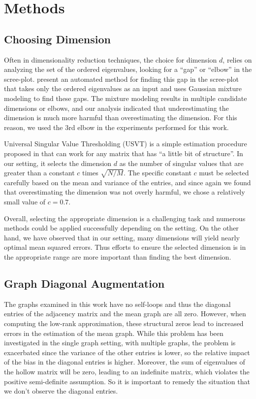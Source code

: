 \documentclass[10pt,letterpaper]{article}
\begin{document}
\section{Methods}
\label{sec:method}

\subsection{Choosing Dimension}
\label{section:dim_select}
Often in dimensionality reduction techniques, the choice for dimension $d$, relies on analyzing the set of the ordered eigenvalues, looking for a ``gap'' or ``elbow'' in the scree-plot. \citet{zhu2006automatic} present an automated method for finding this gap in the scree-plot that takes only the ordered eigenvalues as an input and uses Gaussian mixture modeling to find these gaps.
The mixture modeling results in multiple candidate dimensions or elbows, and our analysis indicated that underestimating the dimension is much more harmful than overestimating the dimension.
For this reason, we used the 3rd elbow in the experiments performed for this work.

Universal Singular Value Thresholding (USVT) is a simple estimation procedure proposed in \citet{chatterjee2015matrix} that can work for any matrix that has ``a little bit of structure''. 
In our setting, it selects the dimension $d$ as the number of singular values that are greater than a constant $c$ times $\sqrt{N/M}$.
The specific constant $c$ must be selected carefully based on the mean and variance of the entries, and since again we found that overestimating the dimension was not overly harmful, we chose a relatively small value of $c=0.7$.

Overall, selecting the appropriate dimension is a challenging task and numerous methods could be applied successfully depending on the setting.
On the other hand, we have observed that in our setting, many dimensions will yield nearly optimal mean squared errors. 
Thus efforts to ensure the selected dimension is in the appropriate range are more important than finding the best dimension.



\subsection{Graph Diagonal Augmentation}
\label{section:diag_aug}
The graphs examined in this work have no self-loops and thus the diagonal entries of the adjacency matrix and the mean graph are all zero.
However, when computing the low-rank approximation, these structural zeros lead to increased errors in the estimation of the mean graph. 
While this problem has been investigated in the single graph setting, with multiple graphs, the problem is exacerbated since the variance of the other entries is lower, so the relative impact of the bias in the diagonal entries is higher.
Moreover, the sum of eigenvalues of the hollow matrix will be zero, leading to an indefinite matrix, which violates the positive semi-definite assumption. So it is important to remedy the situation that we don't observe the diagonal entries.
\end{document}

